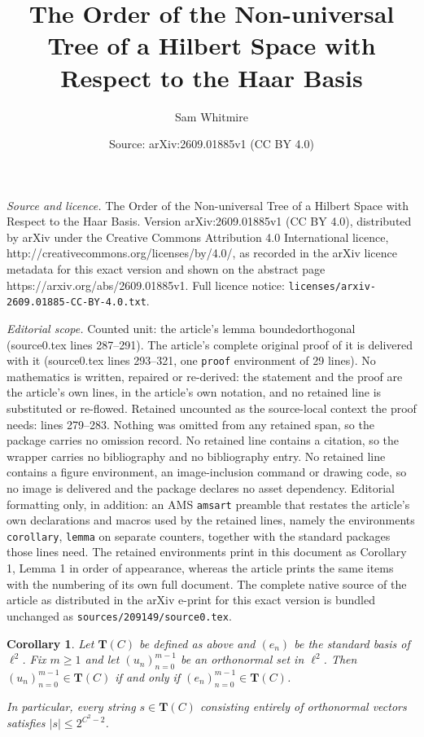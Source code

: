 \documentclass[10pt,a4paper]{amsart}
\title{The Order of the Non-universal Tree of a Hilbert Space with Respect to the Haar Basis}
\author{Sam Whitmire}
\date{Source: arXiv:2609.01885v1 (CC BY 4.0)}
\newtheorem{corollary}{Corollary}
\begin{document}
\maketitle

\noindent\emph{Source and licence.} The Order of the Non-universal Tree of a Hilbert Space with Respect to the Haar Basis. Version arXiv:2609.01885v1 (CC BY 4.0), distributed by arXiv under the Creative Commons Attribution 4.0 International licence, http://creativecommons.org/licenses/by/4.0/, as recorded in the arXiv licence metadata for this exact version and shown on the abstract page https://arxiv.org/abs/2609.01885v1. Full licence notice: \texttt{licenses/arxiv-2609.01885-CC-BY-4.0.txt}.\par\smallskip

\noindent\textit{Editorial scope.} Counted unit: the article's lemma boundedorthogonal (source0.tex lines 287--291). The article's complete original proof of it is delivered with it (source0.tex lines 293--321, one \texttt{proof} environment of 29 lines). No mathematics is written, repaired or re-derived: the statement and the proof are the article's own lines, in the article's own notation, and no retained line is substituted or re-flowed.  Retained uncounted as the source-local context the proof needs: lines 279--283.  Nothing was omitted from any retained span, so the package carries no omission record.  No retained line contains a citation, so the wrapper carries no bibliography and no bibliography entry.  No retained line contains a figure environment, an image-inclusion command or drawing code, so no image is delivered and the package declares no asset dependency.  Editorial formatting only, in addition: an AMS \texttt{amsart} preamble that restates the article's own declarations and macros used by the retained lines, namely the environments \texttt{corollary}, \texttt{lemma} on separate counters, together with the standard packages those lines need.  The retained environments print in this document as Corollary 1, Lemma 1 in order of appearance, whereas the article prints the same items with the numbering of its own full document.  The complete native source of the article as distributed in the arXiv e-print for this exact version is bundled unchanged as \texttt{sources/209149/source0.tex}.
\begin{corollary}\label{reorder}
Let $\textbf{T}(C)$ be defined as above and $(e_n)$ be the standard basis of $\ell^2$. Fix $m\geq 1$ and let $(u_n)_{n=0}^{m-1}$ be an orthonormal set in $\ell^2$. Then $(u_n)_{n=0}^{m-1}\in \textbf{T}(C)$ if and only if $(e_n)_{n=0}^{m-1}\in \textbf{T}(C)$. 

 In particular, every string $s\in \textbf{T}(C)$ consisting entirely of orthonormal vectors satisfies $|s|\leq 2^{C^2-2}$.
\end{corollary}
\end{document}
